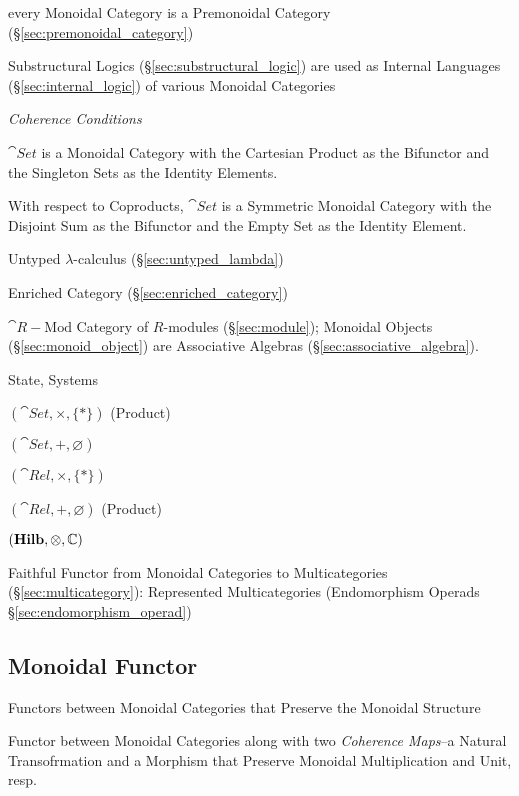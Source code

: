 every Monoidal Category is a Premonoidal Category
(\S\ref{sec:premonoidal_category})

\fist Substructural Logics (\S\ref{sec:substructural_logic}) are used
as Internal Languages (\S\ref{sec:internal_logic}) of various Monoidal
Categories


\emph{Coherence Conditions}

$\cat{Set}$ is a Monoidal Category with the Cartesian Product as
the Bifunctor and the Singleton Sets as the Identity Elements.

With respect to Coproducts, $\cat{Set}$ is a Symmetric Monoidal
Category with the Disjoint Sum as the Bifunctor and the Empty
Set as the Identity Element.

Untyped $\lambda$-calculus (\S\ref{sec:untyped_lambda})

Enriched Category (\S\ref{sec:enriched_category})

$\cat{R-\text{Mod}}$ Category of $R$-modules (\S\ref{sec:module});
Monoidal Objects (\S\ref{sec:monoid_object}) are Associative Algebras
(\S\ref{sec:associative_algebra}).

State, Systems %

$(\cat{Set}, \times, \{*\})$ (Product)

$(\cat{Set}, +, \varnothing)$

$(\cat{Rel}, \times, \{*\})$

$(\cat{Rel}, +, \varnothing)$ (Product)

$(\mathbf{Hilb}, \otimes, \mathbb{C})$

Faithful Functor from Monoidal Categories to Multicategories
(\S\ref{sec:multicategory}): Represented Multicategories (Endomorphism
Operads \S\ref{sec:endomorphism_operad})



\subsection{Monoidal Functor}\label{sec:monoidal_functor}

Functors between Monoidal Categories that Preserve the Monoidal
Structure

Functor between Monoidal Categories along with two \emph{Coherence
  Maps}--a Natural Transofrmation and a Morphism that Preserve
Monoidal Multiplication and Unit, resp.

